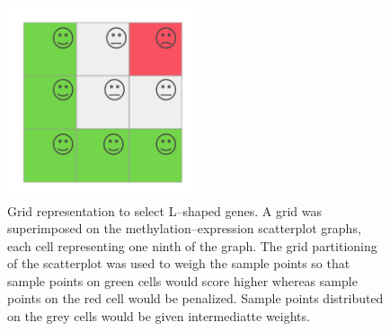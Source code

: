 \documentclass[10pt,letterpaper]{article}
\begin{document}
\begin{figure}
\hypertarget{id}{%
\centering
\includegraphics[width=0.5\textwidth,height=0.3\textheight]{figures/Figure2.png}
\caption{Grid representation to select L--shaped genes. A grid was
superimposed on the methylation--expression scatterplot graphs, each
cell representing one ninth of the graph. The grid partitioning of the
scatterplot was used to weigh the sample points so that sample points on
green cells would score higher whereas sample points on the red cell
would be penalized. Sample points distributed on the grey cells would be
given intermediatte weights.}\label{id}
}
\end{figure}
\end{document}
